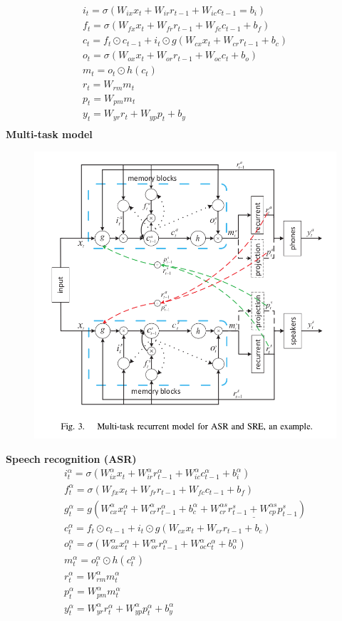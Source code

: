 \documentclass{article}
\begin{document}
	\begin{gather*}
		i_t = \sigma(W_{ix}x_t + W_{ir}r_{t-1} + W_{ic}c_{t-1}=b_i)\\
		f_t = \sigma(W_{fx}x_t + W_{fr}r_{t-1} + W_{fc}c_{t-1}+b_f)\\
		c_t = f_t \odot c_{t-1} + i_t \odot g(W_{cx}x_t + W_{cr}r_{t-1} + b_c)\\
		o_t = \sigma(W_{ox}x_t + W_{or}r_{t-1} + W_{oc}c_t + b_o)\\
		m_t = o_t \odot h(c_t)\\
		r_t = W_{rm}m_t\\
		p_t = W_{pm}m_t\\
		y_t = W_{yr}r_t + W_{yp}p_t + b_y\\
	\end{gather*}
	\textbf{Multi-task model}
	\begin{figure}[H]
		\centering
		\includegraphics[width=0.75\linewidth]{images/multi-task-recurrent-model.png}
		\label{fig:writing-thesis}
	\end{figure}
	\textbf{Speech recognition (ASR)}
	\begin{gather*}
		i^{\alpha}_t = \sigma(W^{\alpha}_{ix}x_t + W^{\alpha}_{ir}r^{\alpha}_{t-1} + W^{\alpha}_{ic}c^{\alpha}_{t-1}+b^{\alpha}_i)\\
		f^{\alpha}_t = \sigma(W_{fx}x_t + W_{fr}r_{t-1} + W_{fc}c_{t-1}+b_f)\\
		g^{\alpha}_t = g(W^{\alpha}_{cx}x^{\alpha}_t + W^{\alpha}_{cr}r^{\alpha}_{t-1} + b^{\alpha}_{c} + \underline{W^{\alpha s}_{cr}r^{s}_{t-1} + W^{\alpha s}_{cp}p^{s}_{t-1}})\\
		c^{\alpha}_t = f_t \odot c_{t-1} + i_t \odot g(W_{cx}x_t + W_{cr}r_{t-1} + b_c)\\
		o^{\alpha}_t = \sigma(W^{\alpha}_{ox}x^{\alpha}_t + W^{\alpha}_{or}r^{\alpha}_{t-1} + W^{\alpha}_{oc}c^{\alpha}_t + b^{\alpha}_o)\\
		m^{\alpha}_t = o^{\alpha}_t \odot h(c^{\alpha}_t)\\
		r^{\alpha}_t = W^{\alpha}_{rm}m^{\alpha}_t\\
		p^{\alpha}_t = W^{\alpha}_{pm}m^{\alpha}_t\\
		y^{\alpha}_t = W^{\alpha}_{yr}r^{\alpha}_t + W^{\alpha}_{yp}p^{\alpha}_t + b^{\alpha}_y\\
	\end{gather*}
\end{document}
